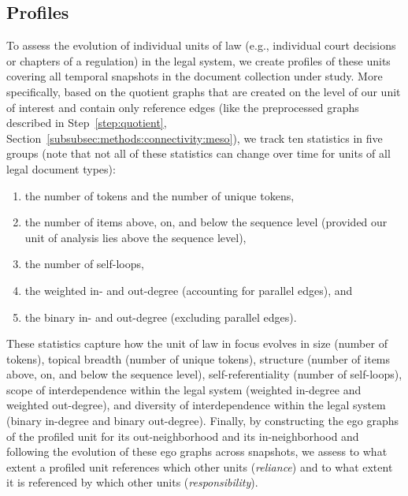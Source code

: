 \subsection{Profiles}
\label{subsec:methods:profiles}

To assess the evolution of individual units of law (e.g., individual court decisions or chapters of a regulation) in the legal system, we create profiles of these units covering all temporal snapshots in the document collection under study.
More specifically, based on the quotient graphs that are created on the level of our unit of interest and contain only reference edges (like the preprocessed graphs described in Step~\ref{step:quotient}, Section~\ref{subsubsec:methods:connectivity:meso}), 
we track ten statistics in five groups (note that not all of these statistics can change over time for units of all legal document types):
\begin{enumerate}
	\item the number of tokens and the number of unique tokens,
	\item the number of items above, on, and below the sequence level (provided our unit of analysis lies above the sequence level),
	\item the number of self-loops,
	\item the weighted in- and out-degree (accounting for parallel edges), and
	\item the binary in- and out-degree (excluding parallel edges).
\end{enumerate} 

These statistics capture how the unit of law in focus evolves in size (number of tokens), 
topical breadth (number of unique tokens), 
structure (number of items above, on, and below the sequence level), 
self-referentiality (number of self-loops), 
scope of interdependence within the legal system (weighted in-degree and weighted out-degree), 
and diversity of interdependence within the legal system (binary in-degree and binary out-degree).
Finally, by constructing the ego graphs of the profiled unit for its out-neighborhood and its in-neighborhood and following the evolution of these ego graphs across snapshots,
we assess to what extent a profiled unit references which other units (\emph{reliance}) 
and to what extent it is referenced by which other units (\emph{responsibility}).
